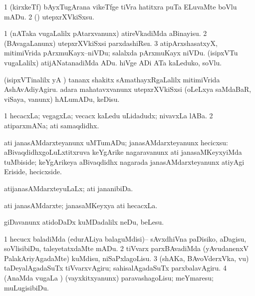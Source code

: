 \bentry
{}
\gl{\sakirx}
\bmng
\bnum
\num{1} (kirxkeTf) bAyxTugArana vikeTfge tiVra hatitxra puTa ELuvaMte boVlu mADu. 
\num{2} (\rUpa) utepxrXVkiSxsu. 
\enum
\emng
\eentry


\bentry
{}
\gl{\sakirx}
\bmng
\bnum
\num{1} (nATaka \mo vugaLalilx pAtarxvanunx) atireVkadiMda aBinayisu. 
\num{2} (BAvagaLanunx) utepxrXVkiSxsi parxdashiRsu. 
\num{3} atipArxshasatxyX, mitimiVrida pArxmuKayx--niVDu; salalxda pArxmuKayx niVDu. 
 (isipxVTu \mo vugaLalilx) 
\banum
{} atijANatanadiMda ADu. 
 hiVge ADi ATa kaLeduko, soVlu. 
\eanum
\numie
\enum
\emng

\noindent
\gl{\pagu}
\bmng
{} 
\banum
{} (isipxVTinalilx yA \rUpa) tananx shakitx sAmathayxRgaLalilx mitimiVrida AshAvAdiyAgiru. 
 adara mahatavxvanunx utepxrXVkiSxsi (oLeLxya saMdaBaR, viSaya, \mo vanunx) hALumADu, keDisu. 
\eanum
\emng
\eentry


\bentry
{}
\gl{\nA}
\bmng
\bnum
\num{1} hecacxLa; vegagxLa; vecacx kaLedu uLidadudx; nivavxLa lABa. 
\num{2} atiparxmANa; ati samaqdidhx. 
\enum
\emng
\eentry


\bentry
{}
\gl{\sakirx}
\bmng
ati janasAMdarxteyanunx uMTumADu; janasAMdarxteyanunx hecicxsu:  aBivaqdidhxgoLuLxtitxruva keYgArike nagaravanunx ati janasaMKeyxyiMda tuMbiside; keYgArikeya aBivaqdidhx nagarada janasAMdarxteyanunx atiyAgi Eriside, hecicxside. 
\emng
\eentry


\bentry
{}
\gl{\gu}
\bmng
atijanasAMdarxteyuLaLx; ati jananibiDa. 
\emng
\eentry


\bentry
{}
\gl{\nA}
\bmng
ati janasAMdarxte; janasaMKeyxya ati hecacxLa. 
\emng
\eentry


\bentry
{}
\gl{\sakirx}
\bmng
giDavanunx atidoDaDx kuMDadalilx neDu, beLesu. 
\emng
\eentry


\bentry
{}
\gl{\sakirx}
\bmng
\bnum
\num{1} hecucx baladiMda (edurALiya balaguMdisi)-- sAvxdhiVna paDisiko, aDagisu, soVlisibiDu, taleyetatxdaMte mADu. 
\num{2} tiVvarx parxBAvadiMda (yAvudanenxV PalakAriyAgadaMte) kuMdisu, niSaPxlagoLisu. 
\num{3} (shAKa, BAvoVderxVka, \mo vu) taDeyalAgadaSuTx tiVvarxvAgiru; sahisalAgadaSuTx parxbalavAgiru. 
\num{4} (AnaMda \mo vugaLa \vi) (vayxkitxyanunx) paravashagoLisu; meYmaresu; muLugisibiDu. 
\enum
\emng
\eentry



